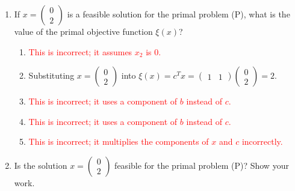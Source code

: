 \documentclass{article}%
\newcommand{\incorrect}[1]{\textcolor{red}{#1}}
\begin{document}
\begin{enumerate}
\begin{enumerate}
\begin{enumerate}
\item \incorrect{This option incorrectly changes the direction of the inequalities in the constraints.}%
\item \incorrect{This option incorrectly changes the direction of the inequalities and the type of the objective function.}%
\item \incorrect{This option incorrectly changes the type of the objective function.}%
\item \incorrect{This option incorrectly uses $c$ instead of $b$ in the objective function and incorrectly reverses the inequalities in the constraints.}%
\end{enumerate}%
\vspace{0.5em}%
\item If $x = \begin{pmatrix} 0 \\ 2 \end{pmatrix}$ is a feasible solution for the primal problem (P), what is the value of the primal objective function $\xi(x)$?%
\begin{enumerate}%
\item \incorrect{This is incorrect; it assumes $x_2$ is 0.}%
\item Substituting $x = \begin{pmatrix} 0 \\ 2 \end{pmatrix}$ into $\xi(x) = c^T x = \begin{pmatrix} 1 & 1 \end{pmatrix} \begin{pmatrix} 0 \\ 2 \end{pmatrix} = 2$.%
\item \incorrect{This is incorrect; it uses a component of $b$ instead of $c$.}%
\item \incorrect{This is incorrect; it uses a component of $b$ instead of $c$.}%
\item \incorrect{This is incorrect; it multiplies the components of $x$ and $c$ incorrectly.}%
\end{enumerate}%
\vspace{0.5em}%
\item Is the solution $x = \begin{pmatrix} 0 \\ 2 \end{pmatrix}$ feasible for the primal problem (P)? Show your work.%
\begin{enumerate}%

\end{enumerate}
\end{enumerate}
\end{enumerate}
\end{document}
